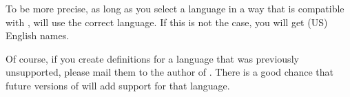 \begin{Explain}
  To be more precise, as long as you select a language in a way that is
  compatible with ,  will
  use the correct language. If this is not the case, you will get (US) English
  names.
\end{Explain}

Of course, if you create definitions for a language that was previously
unsupported, please mail them to the author of \KOMAScript{}. There is a good
chance that future versions of \KOMAScript{} will add support for that
language.%
\EndIndexGroup
%
\EndIndexGroup

\endinput

